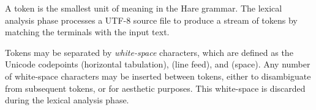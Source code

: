 
\begin{grammar}
\\
	 \\
	 \\
	 \\
	 \\
	 \\

\oneof \\
	\terminal{!}
	\terminal{!=}
	\terminal{\%}
	\terminal{\%=}
	\terminal{\&}
	\terminal{\&\&}
	\terminal{\&\&=}
	\terminal{\&=}
	\terminal{(}
	\terminal{)}
	\terminal{*}
	\terminal{*=}
	\terminal{+}
	\terminal{+=}
	\terminal{,}
	\terminal{-}
	\terminal{-=}
	\terminal{/}
	\terminal{/=}
	\terminal{:}
	\terminal{::}
	\terminal{;}
	\terminal{<}
	\terminal{<<}
	\terminal{<<=}
	\terminal{<=}
	\terminal{=}
	\terminal{==}
	\terminal{=>}
	\terminal{>}
	\terminal{>=}
	\terminal{>>}
	\terminal{>>=}
	\terminal{[}
	\terminal{]}
	\terminal{\textasciicircum}
	\terminal{\textasciicircum=}
	\terminal{\textasciicircum\textasciicircum}
	\terminal{\textasciicircum\textasciicircum=}
	\terminal{\{}
	\terminal{|}
	\terminal{|=}
	\terminal{||}
	\terminal{||=}
	\terminal{\}}
	\terminal{\textasciitilde}

\exactly\\
	\terminal{//}  

\exactly\\
	 

\\

\end{grammar}

\specsubitem
A token is the smallest unit of meaning in the Hare grammar. The lexical
analysis phase processes a \hbox{UTF-8} source file to produce a stream of
tokens by matching the terminals with the input text.

\specsubitem
Tokens may be separated by \textit{white-space} characters, which are defined as
the Unicode codepoints  (horizontal tabulation), 
(line feed), and  (space). Any number of white-space characters may
be inserted between tokens, either to disambiguate from subsequent tokens, or
for aesthetic purposes. This white-space is discarded during the lexical
analysis phase.

